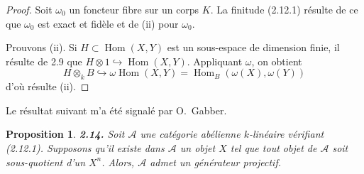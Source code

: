 \documentclass[12pt,a4paper]{article}
\theoremstyle{plain}
\newtheorem{proposition}[theorem]{Proposition}
\theoremstyle{definition}
\theoremstyle{remark}
\DeclareMathOperator{\Hom}{Hom}
\begin{document}
\begin{proof}
Soit $\omega_0$ un foncteur fibre sur un corps $K$. La finitude (2.12.1) résulte de ce que $\omega_0$ est exact et fidèle et de (ii) pour $\omega_0$.

Prouvons (ii). Si $H \subset \Hom(X,Y)$ est un sous-espace de dimension finie, il résulte de 2.9 que $H \otimes 1 \hookrightarrow \Hom(X,Y)$. Appliquant $\omega$, on obtient
\[
H \otimes_k B \hookrightarrow \omega \Hom(X,Y) = \Hom_B(\omega(X), \omega(Y))
\]
d'où résulte (ii).
\end{proof}

Le résultat suivant m'a été signalé par O.~Gabber.

\begin{proposition}\label{prop:2.14}
\textbf{2.14.} Soit $\mathcal{A}$ une catégorie abélienne $k$-linéaire vérifiant (2.12.1). Supposons qu'il existe dans $\mathcal{A}$ un objet $X$ tel que tout objet de $\mathcal{A}$ soit sous-quotient d'un $X^n$. Alors, $\mathcal{A}$ admet un générateur projectif.
\end{proposition}
\end{document}

